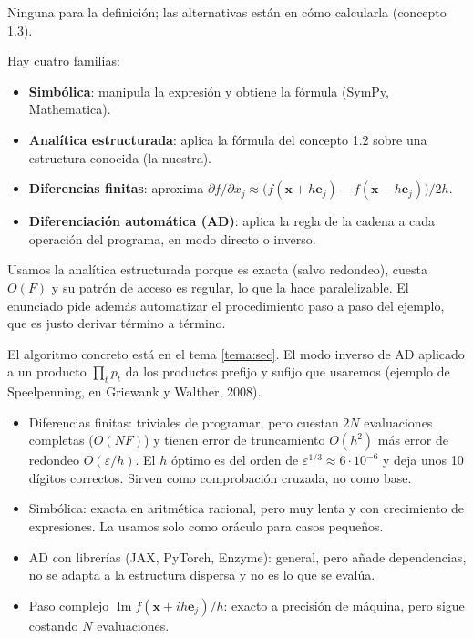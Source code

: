 \alt Ninguna para la definición; las alternativas están en cómo calcularla (concepto 1.3).

\que Hay cuatro familias:
\begin{itemize}
\item \textbf{Simbólica}: manipula la expresión y obtiene la fórmula (SymPy, Mathematica).
\item \textbf{Analítica estructurada}: aplica la fórmula del concepto 1.2 sobre una estructura conocida (la nuestra).
\item \textbf{Diferencias finitas}: aproxima $\partial f/\partial x_j\approx\big(f(\mathbf{x}+h\mathbf{e}_j)-f(\mathbf{x}-h\mathbf{e}_j)\big)/2h$.
\item \textbf{Diferenciación automática (AD)}: aplica la regla de la cadena a cada operación del programa, en modo directo o inverso.
\end{itemize}

\porque Usamos la analítica estructurada porque es exacta (salvo redondeo), cuesta $O(F)$ y su patrón de acceso es regular, lo que la hace paralelizable. El enunciado pide además automatizar el procedimiento paso a paso del ejemplo, que es justo derivar término a término.

\como El algoritmo concreto está en el tema \ref{tema:sec}. El modo inverso de AD aplicado a un producto $\prod_t p_t$ da los productos prefijo y sufijo que usaremos (ejemplo de Speelpenning, en Griewank y Walther, 2008).

\alt
\begin{itemize}
\item Diferencias finitas: triviales de programar, pero cuestan $2N$ evaluaciones completas ($O(NF)$) y tienen error de truncamiento $O(h^2)$ más error de redondeo $O(\varepsilon/h)$. El $h$ óptimo es del orden de $\varepsilon^{1/3}\approx 6\cdot10^{-6}$ y deja unos 10 dígitos correctos. Sirven como comprobación cruzada, no como base.
\item Simbólica: exacta en aritmética racional, pero muy lenta y con crecimiento de expresiones. La usamos solo como oráculo para casos pequeños.
\item AD con librerías (JAX, PyTorch, Enzyme): general, pero añade dependencias, no se adapta a la estructura dispersa y no es lo que se evalúa.
\item Paso complejo $\operatorname{Im} f(\mathbf{x}+ih\mathbf{e}_j)/h$: exacto a precisión de máquina, pero sigue costando $N$ evaluaciones.
\end{itemize}

